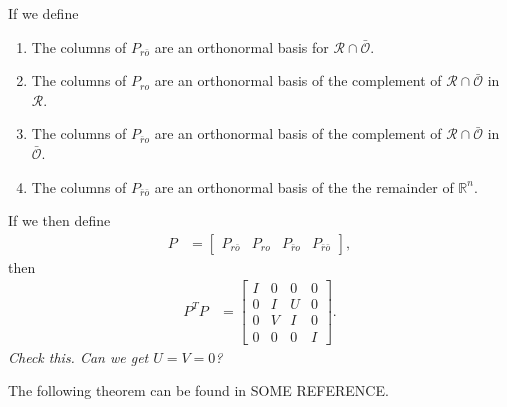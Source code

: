 \documentclass[11 pt]{article}
\newcommand{\plr}[1]{{\color{blue}\it #1}}
\newcommand{\ro}{{ro}}
\newcommand{\nro}{{\bar{r}o}}
\newcommand{\rno}{{r\bar{o}}}
\newcommand{\nrno}{{\bar{r}\bar{o}}}
\newcommand{\reachable}{\mathcal{R}}
\newcommand{\unobservable}{\bar{\mathcal{O}}}
\newcommand{\R}{\mathbb{R}}
\begin{document}
If we define
\begin{enumerate}
    \item The columns of $P_\rno$ are an orthonormal basis for $\reachable \cap \unobservable$.
    \item The columns of $P_\ro$ are an orthonormal basis of
        the complement of $\reachable \cap \unobservable$ in $\reachable$.
    \item The columns of $P_\nro$ are an orthonormal basis of
        the complement of $\reachable \cap \unobservable$ in $\unobservable$.
    \item The columns of $P_\nrno$ are an orthonormal basis of
        the the remainder of $\R^n$.
\end{enumerate}
If we then define
\begin{align*}
    P &= 
    \left[ \begin{array}{c|c|c|c}
        P_\rno & P_\ro & P_\nro & P_\nrno
    \end{array} \right] ,
\end{align*}
then
\begin{align*}
    P^T P
    &=
    \left[ \begin{array}{c|c|c|c}
        I & 0 & 0 & 0 \\
        \hline
        0 & I & U & 0 \\
        \hline
        0 & V & I & 0 \\
        \hline
        0 & 0 & 0 & I 
    \end{array} \right] .
\end{align*}
\plr{Check this.  Can we get $U=V=0$?}

The following theorem can be found in SOME REFERENCE.
\end{document}
